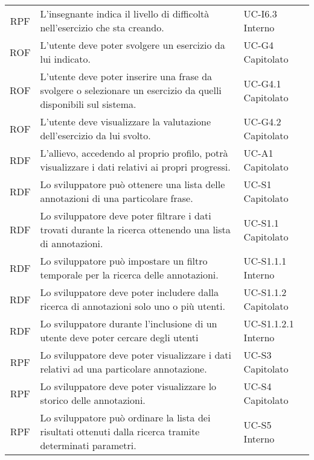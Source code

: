 \begin{tabularx}{\textwidth}{| c | p{10cm} | X |}
		RPF & L'insegnante indica il livello di difficoltà nell'esercizio che sta creando. & UC-I6.3 \newline Interno\\
		ROF & L'utente deve poter svolgere un esercizio da lui indicato. & UC-G4 \newline Capitolato\\
		ROF & L'utente deve poter inserire una frase da svolgere o selezionare un esercizio da quelli disponibili sul sistema. & UC-G4.1 \newline Capitolato\\
		ROF & L'utente deve visualizzare la valutazione dell'esercizio da lui svolto. & UC-G4.2 \newline Capitolato\\
		RDF & L'allievo, accedendo al proprio profilo, potrà visualizzare i dati relativi ai propri progressi. & UC-A1 \newline Capitolato\\
		RDF & Lo sviluppatore può ottenere una lista delle annotazioni di una particolare frase. & UC-S1 \newline Capitolato\\
		RDF & Lo sviluppatore deve poter filtrare i dati trovati durante la ricerca ottenendo una lista di annotazioni. & UC-S1.1 \newline Capitolato\\
		RDF & Lo sviluppatore può impostare un filtro temporale per la ricerca delle annotazioni. & UC-S1.1.1 \newline Interno\\
		RDF & Lo sviluppatore deve poter includere dalla ricerca di annotazioni solo uno o più utenti. & UC-S1.1.2 \newline Capitolato\\
		RDF & Lo sviluppatore durante l'inclusione di un utente deve poter cercare degli utenti & UC-S1.1.2.1 \newline Interno\\		
		RPF & Lo sviluppatore deve poter visualizzare i dati relativi ad una particolare annotazione. & UC-S3 \newline Capitolato\\
		RPF & Lo sviluppatore deve poter visualizzare lo storico delle annotazioni. & UC-S4 \newline Capitolato\\
		RPF & Lo sviluppatore può ordinare la lista dei risultati ottenuti dalla ricerca tramite determinati parametri. & UC-S5 \newline Interno\\	

\end{tabularx}
